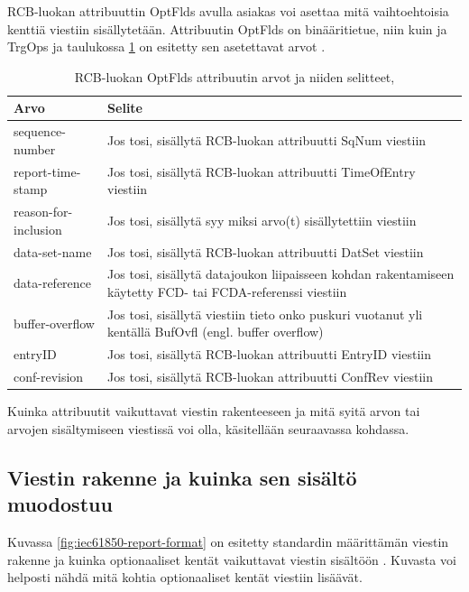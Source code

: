 RCB-luokan attribuuttin OptFlds avulla asiakas voi asettaa mitä vaihtoehtoisia kenttiä viestiin sisällytetään. Attribuutin OptFlds on binääritietue, niin kuin ja TrgOps ja taulukossa \ref{tab:iec61850-optional-fields-definition} on esitetty sen asetettavat arvot \cite[s.~98]{IEC61850-7-2}.

\begin{table}[ht!]
	\caption{RCB-luokan OptFlds attribuutin arvot ja niiden selitteet,}
	\label{tab:iec61850-optional-fields-definition}
	\begin{tabular}{l | l}
		\hline
		\textbf{Arvo} & \textbf{Selite} \\
		\hline \hline
		sequence-number & Jos tosi, sisällytä RCB-luokan attribuutti SqNum viestiin \\
		report-time-stamp & Jos tosi, sisällytä RCB-luokan attribuutti TimeOfEntry viestiin \\
		reason-for-inclusion & Jos tosi, sisällytä syy miksi arvo(t) sisällytettiin viestiin \\
		data-set-name & Jos tosi, sisällytä RCB-luokan attribuutti DatSet viestiin \\
		data-reference & \parbox[t]{10cm}{Jos tosi, sisällytä datajoukon liipaisseen kohdan rakentamiseen käytetty FCD- tai FCDA-referenssi viestiin} \\
		buffer-overflow & \parbox[t]{10cm}{Jos tosi, sisällytä viestiin tieto onko puskuri vuotanut yli kentällä BufOvfl (engl. buffer overflow)} \\
		entryID & Jos tosi, sisällytä RCB-luokan attribuutti EntryID viestiin \\
		conf-revision & Jos tosi, sisällytä RCB-luokan attribuutti ConfRev viestiin \\
		\hline
	\end{tabular}
\end{table}

Kuinka attribuutit vaikuttavat viestin rakenteeseen ja mitä syitä arvon tai arvojen sisältymiseen viestissä voi olla, käsitellään seuraavassa kohdassa.


\subsection{Viestin rakenne ja kuinka sen sisältö muodostuu}
Kuvassa \ref{fig:iec61850-report-format} on esitetty standardin määrittämän viestin rakenne ja kuinka optionaaliset kentät vaikuttavat viestin sisältöön \cite[s.~104]{IEC61850-7-2}. Kuvasta voi helposti nähdä mitä kohtia optionaaliset kentät viestiin lisäävät.


